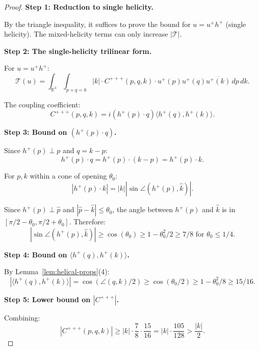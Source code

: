 \documentclass[11pt]{article}
\theoremstyle{definition}
\newcommand{\R}{\mathbb{R}}
\begin{document}
\begin{proof}
\textbf{Step 1: Reduction to single helicity.}

By the triangle inequality, it suffices to prove the bound for $u = u^+ h^+$ (single helicity). The mixed-helicity terms can only increase $|\mathcal{T}|$.

\textbf{Step 2: The single-helicity trilinear form.}

For $u = u^+ h^+$:
\begin{equation}
\mathcal{T}(u) = \int_{\R^3} \int_{p+q=k} |k| \cdot C^{+++}(p,q,k) \cdot u^+(p) u^+(q) \overline{u^+(k)} \, dp \, dk.
\end{equation}

The coupling coefficient:
\begin{equation}
C^{+++}(p,q,k) = i(h^+(p) \cdot q) \langle h^+(q), h^+(k) \rangle.
\end{equation}

\textbf{Step 3: Bound on $(h^+(p) \cdot q)$.}

Since $h^+(p) \perp p$ and $q = k - p$:
\begin{equation}
h^+(p) \cdot q = h^+(p) \cdot (k - p) = h^+(p) \cdot k.
\end{equation}

For $p, k$ within a cone of opening $\theta_0$:
\begin{equation}
|h^+(p) \cdot k| = |k| |\sin\angle(h^+(p), \hat{k})|.
\end{equation}

Since $h^+(p) \perp \hat{p}$ and $|\hat{p} - \hat{k}| \leq \theta_0$, the angle between $h^+(p)$ and $\hat{k}$ is in $[\pi/2 - \theta_0, \pi/2 + \theta_0]$. Therefore:
\begin{equation}
|\sin\angle(h^+(p), \hat{k})| \geq \cos(\theta_0) \geq 1 - \theta_0^2/2 \geq 7/8 \text{ for } \theta_0 \leq 1/4.
\end{equation}

\textbf{Step 4: Bound on $\langle h^+(q), h^+(k) \rangle$.}

By Lemma~\ref{lem:helical-props}(4):
\begin{equation}
|\langle h^+(q), h^+(k) \rangle| = \cos(\angle(q,k)/2) \geq \cos(\theta_0/2) \geq 1 - \theta_0^2/8 \geq 15/16.
\end{equation}

\textbf{Step 5: Lower bound on $|C^{+++}|$.}

Combining:
\begin{equation}
|C^{+++}(p,q,k)| \geq |k| \cdot \frac{7}{8} \cdot \frac{15}{16} = |k| \cdot \frac{105}{128} > \frac{|k|}{2}.
\end{equation}


\end{proof}
\end{document}
